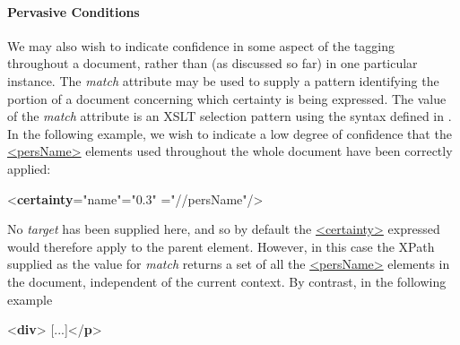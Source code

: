 \paragraph[{Pervasive Conditions}]{Pervasive Conditions}\par
We may also wish to indicate confidence in some aspect of the tagging throughout a document, rather than (as discussed so far) in one particular instance. The {\itshape match} attribute may be used to supply a pattern identifying the portion of a document concerning which certainty is being expressed. The value of the {\itshape match} attribute is an XSLT selection pattern using the syntax defined in \cite{XSLT3}. In the following example, we wish to indicate a low degree of confidence that the \hyperref[TEI.persName]{<persName>} elements used throughout the whole document have been correctly applied: \par\bgroup{}\exampleFont \begin{shaded}\noindent\mbox{}{<\textbf{certainty}\hspace*{1em}{locus}="{name}"\hspace*{1em}{degree}="{0.3}"\mbox{}\newline 
\hspace*{1em}{match}="{//persName}"/>}\end{shaded}\egroup\par \noindent  No {\itshape target} has been supplied here, and so by default the \hyperref[TEI.certainty]{<certainty>} expressed would therefore apply to the parent element. However, in this case the XPath supplied as the value for {\itshape match} returns a set of all the \hyperref[TEI.persName]{<persName>} elements in the document, independent of the current context. By contrast, in the following example \par\bgroup{}\exampleFont \begin{shaded}\noindent\mbox{}{<\textbf{div}>}\mbox{}\newline 
{}[...]{</\textbf{p}>}\mbox{}\newline 

\end{shaded}
